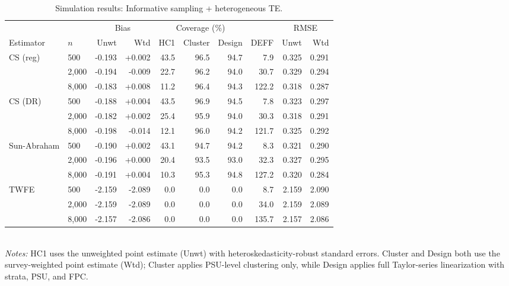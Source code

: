 \begin{table}[ht]
\centering
\small
\caption{Simulation results: Informative sampling + heterogeneous TE.}
\label{tab:sim-s2}
\begin{tabular}{@{}llrrrrrrrr@{}}
\toprule
 & & \multicolumn{2}{c}{Bias} & \multicolumn{3}{c}{Coverage (\%)} &  & \multicolumn{2}{c}{RMSE} \\
\cmidrule(lr){3-4} \cmidrule(lr){5-7} \cmidrule(lr){9-10}
{Estimator} & {$n$} & {Unwt} & {Wtd} & {HC1} & {Cluster} & {Design} & {DEFF} & {Unwt} & {Wtd} \\
\midrule
CS (reg) & 500 & -0.193 & +0.002 & 43.5 & 96.5 & 94.7 & 7.9 & 0.325 & 0.291 \\
 & 2,000 & -0.194 & -0.009 & 22.7 & 96.2 & 94.0 & 30.7 & 0.329 & 0.294 \\
 & 8,000 & -0.183 & +0.008 & 11.2 & 96.4 & 94.3 & 122.2 & 0.318 & 0.287 \\
CS (DR) & 500 & -0.188 & +0.004 & 43.5 & 96.9 & 94.5 & 7.8 & 0.323 & 0.297 \\
 & 2,000 & -0.182 & +0.002 & 25.4 & 95.9 & 94.0 & 30.3 & 0.318 & 0.291 \\
 & 8,000 & -0.198 & -0.014 & 12.1 & 96.0 & 94.2 & 121.7 & 0.325 & 0.292 \\
Sun-Abraham & 500 & -0.190 & +0.002 & 43.1 & 94.7 & 94.2 & 8.3 & 0.321 & 0.290 \\
 & 2,000 & -0.196 & +0.000 & 20.4 & 93.5 & 93.0 & 32.3 & 0.327 & 0.295 \\
 & 8,000 & -0.191 & +0.004 & 10.3 & 95.3 & 94.8 & 127.2 & 0.320 & 0.284 \\
TWFE & 500 & -2.159 & -2.089 & 0.0 & 0.0 & 0.0 & 8.7 & 2.159 & 2.090 \\
 & 2,000 & -2.159 & -2.089 & 0.0 & 0.0 & 0.0 & 34.0 & 2.159 & 2.089 \\
 & 8,000 & -2.157 & -2.086 & 0.0 & 0.0 & 0.0 & 135.7 & 2.157 & 2.086 \\
\bottomrule
\end{tabular}
\\[2pt]\footnotesize \emph{Notes:} HC1 uses the unweighted point estimate (Unwt) with heteroskedasticity-robust standard errors. Cluster and Design both use the survey-weighted point estimate (Wtd); Cluster applies PSU-level clustering only, while Design applies full Taylor-series linearization with strata, PSU, and FPC.
\end{table}
